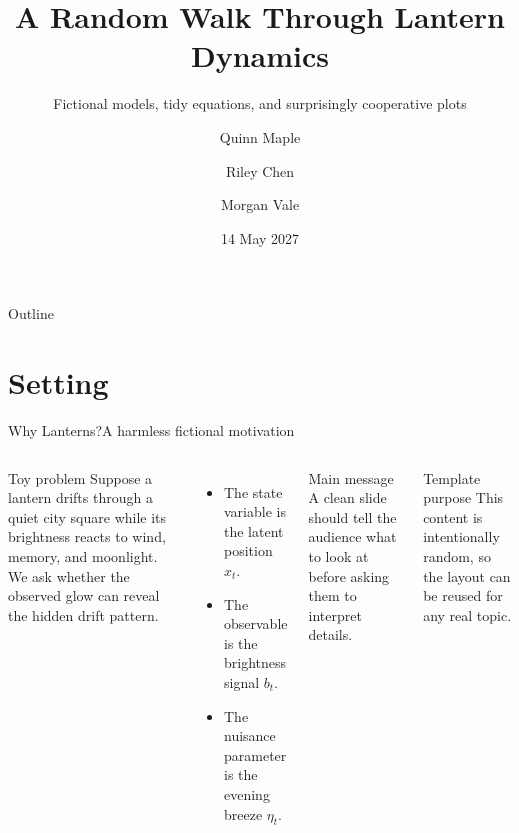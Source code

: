 \documentclass[aspectratio=169,professionalfonts]{beamer}
\title[Lantern Dynamics]{A Random Walk Through Lantern Dynamics}
\subtitle{Fictional models, tidy equations, and surprisingly cooperative plots}
\author[Q. Maple et al.]{Quinn Maple \and Riley Chen \and Morgan Vale}
\institute[CityUHK]{Department of Imaginary Systems, City University of Hong Kong}
\date[May 2027]{14 May 2027}
\begin{document}
{
\usebackgroundtemplate{\CityUHKFullBackground{\CityUHKClosingBg}}
\begin{frame}[plain]
  \titlepage
\end{frame}
}

\begin{frame}{Outline}
  \tableofcontents
\end{frame}

\section{Setting}

\begin{frame}{Why Lanterns?}{A harmless fictional motivation}
  \begin{columns}[T,totalwidth=\textwidth]
    \begin{block}{Toy problem}
      Suppose a lantern drifts through a quiet city square while its brightness reacts to wind, memory, and moonlight.
      We ask whether the observed glow can reveal the hidden drift pattern.
    \end{block}

    \begin{itemize}
      \item The state variable is the latent position $x_t$.
      \item The observable is the brightness signal $b_t$.
      \item The nuisance parameter is the evening breeze $\eta_t$.
    \end{itemize}

    \begin{alertblock}{Main message}
      A clean slide should tell the audience what to look at before asking them to interpret details.
    \end{alertblock}

    \begin{exampleblock}{Template purpose}
      This content is intentionally random, so the layout can be reused for any real topic.
    \end{exampleblock}
  \end{columns}
\end{frame}
\end{document}
